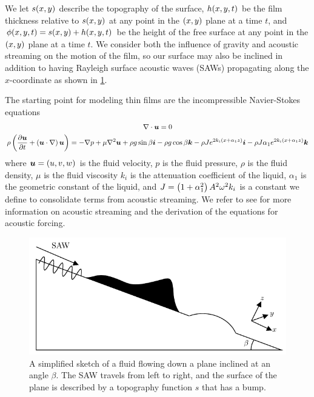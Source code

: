 We let $s\!\left( x, y \right)$ describe the topography of the surface, 
$h\!\left( x,y,t \right)$ be the film thickness relative to $s\!\left( x,y \right)$ at any point in the $\left( x,y \right)$ plane at a time $t$, 
and $\phi\!\left( x,y,t \right) = s\!\left( x,y \right) + h\!\left( x,y,t \right)$ be the height of the free surface at any point in the $\left( x,y \right)$ plane at a time $t$.
We consider both the influence of gravity and acoustic streaming on the motion of the film, so 
our surface may also be inclined in addition to having Rayleigh surface acoustic waves (SAWs) propagating along the 
$x$-coordinate as shown in \cref{fig:diagram}. 

The starting point for modeling thin films are the incompressible Navier-Stokes equations 
\begin{gather}
    \nabla \cdot \boldsymbol{u} = 0
    \label{eq:incompress}\\
    \rho \left( \frac{\partial \boldsymbol{u}}{\partial t} + \left( \boldsymbol{u} \cdot \nabla \right)\boldsymbol{u} \right) = -\nabla p
    + \mu \nabla^2 \boldsymbol{u} + \rho g \sin \beta \boldsymbol{i} - \rho g \cos \beta \boldsymbol{k}
    - \rho J e^{2k_i \left( x + \alpha_1 z \right)} \boldsymbol{i} - \rho J \alpha_1 e^{2k_i \left( x + \alpha_1 z \right)} \boldsymbol{k}
    \label{eq:ns-eq}
\end{gather}
where $\boldsymbol{u} = \left( u,v,w \right)$ is the fluid velocity, $p$ is the fluid pressure, $\rho$ is the fluid density, $\mu$ is the fluid viscosity
$k_i$ is the attenuation coefficient of the liquid, $\alpha_1$ is the geometric constant of the liquid, and $J = \left( 1 + \alpha_1^2 \right)A^2\omega^2 k_i$ 
is a constant we define to consolidate terms from acoustic streaming. We refer to see \cite{shiokawa1994saw} for more information on acoustic streaming 
and the derivation of the equations for acoustic forcing. 

\begin{figure}[ht]  
    \centering
    \includegraphics[width=.75\textwidth]{images/samp_diagram.pdf}
    \caption{A simplified sketch of a fluid flowing down a plane inclined at an angle $\beta$. The SAW travels
    from left to right, and the surface of the plane is described by a topography function $s$ that has a bump.}
    \label{fig:diagram}
\end{figure} 



